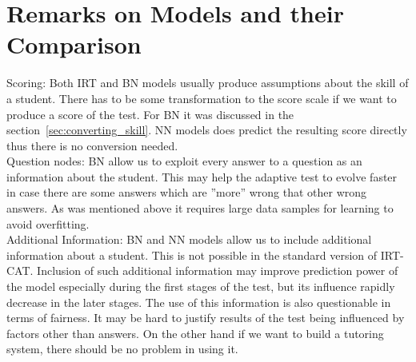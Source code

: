 \section{Remarks on Models and their Comparison}
Scoring: Both IRT and BN models usually produce assumptions about the skill of a student. There has to be some transformation to the score scale if we want to produce a score of the test. For BN it was discussed in the section~\ref{sec:converting_skill}. NN models does predict the resulting score directly thus there is no conversion needed.\\
Question nodes: BN allow us to exploit every answer to a question as an information about the student. This may help the adaptive test to evolve faster in case there are some answers which are ''more'' wrong that other wrong answers. As was mentioned above it requires large data samples for learning to avoid overfitting.\\
Additional Information: BN and NN models allow us to include additional information about a student. This is not possible in the standard version of IRT-CAT. Inclusion of such additional information may improve prediction power of the model especially during the first stages of the test, but its influence rapidly decrease in the later stages. The use of this information is also questionable in terms of fairness. It may be hard to justify results of the test being influenced by factors other than answers. On the other hand if we want to build a tutoring system, there should be no problem in using it.

